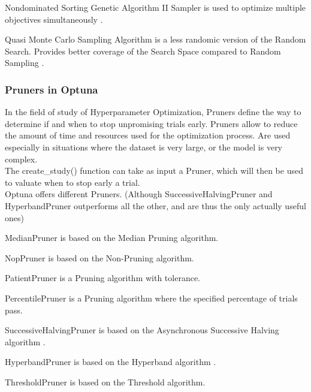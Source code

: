 Nondominated Sorting Genetic Algorithm II Sampler is used to optimize multiple objectives simultaneously \cite{OptunaSamplers-NSGAII}.

Quasi Monte Carlo Sampling Algorithm is a less randomic version of the Random Search. Provides better coverage of the Search Space compared to Random Sampling \cite{OptunaSamplers-RandomSearch}.

\subsubsection{Pruners in Optuna}

In the field of study of Hyperparameter Optimization, Pruners define the way to determine if and when to stop unpromising trials early.
Pruners allow to reduce the amount of time and resources used for the optimization process. Are used especially in situations where the dataset is very large, or the model is very complex.
\\[0.3cm]The create\_study() function can take as input a Pruner, which will then be used to valuate when to stop early a trial.
\\[0.3cm]Optuna offers different Pruners. (Although SuccessiveHalvingPruner and HyperbandPruner outperforms all the other, and are thus the only actually useful ones)

MedianPruner is based on the Median Pruning algorithm.

NopPruner is based on the Non-Pruning algorithm.

PatientPruner is a Pruning algorithm with tolerance.

PercentilePruner is a Pruning algorithm where the specified percentage of trials pass.

SuccessiveHalvingPruner is based on the Asynchronous Successive Halving algorithm \cite{OptunaPruners-SuccessiveHalvingAlgorithm} \cite{OptunaPruners-AsynchronousSuccessiveHalvingAlgorithm}.

HyperbandPruner is based on the Hyperband algorithm \cite{OptunaPruners-Hyperband}.

ThresholdPruner is based on the Threshold algorithm.

